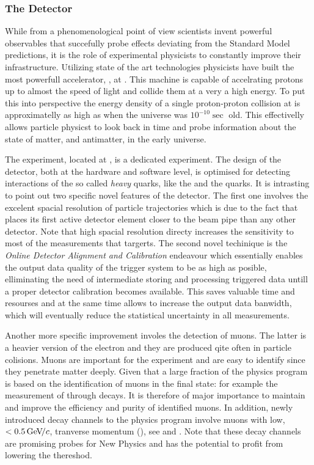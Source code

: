 \subsubsection{The \lhcb Detector}
While from a phenomenological point of view scientists invent powerful observables that succefully probe
effects deviating from the Standard Model predictions, it is the role of experimental physicists to
constantly improve their infrastructure. Utilizing state of the art technologies physicists have
built the most powerfull accelerator, \lhc, at \cern. This machine is capable of accelrating protons
up to almost the speed of light and collide them at a very a high energy. To put this into perspective
the energy density of a single proton-proton collision at \lhc is approximatelly as high as when the
universe was $10^{-10} \sec$ old. This effectivelly allows particle physicst to look back in time and
probe information about the state of matter, and antimatter, in the early universe.

The \lhcb experiment, located at \cern, is a dedicated experiment. The design of the detector,
both at the hardware and software level, is optimised for detecting interactions of the so called
{\it heavy} quarks, like the \bquark and the \cquark quarks. It is intrasting to point out two specific
novel features of the detector. The first one involves the excelent spacial resolution of particle
trajectories which is due to the fact that \lhcb places its first active detector element closer
to the \lhc beam pipe than any other detector. Note that high spacial resolution directy increases
the sensitivity to most of the measurements that \lhcb targerts. The second novel techinique is the
{\it Online Detector Alignment and Calibration} endeavour which essentially enables the output data
quality of the trigger system to be as high as posible, elliminating the need of intermediate storing
and processing triggered data untill a proper detector calibration becomes available.
This saves valuable time and resourses and at the same time allows to increase the output data banwidth,
which will eventually reduce the statistical uncertainty in all \lhcb measurements.

Another more specific improvement involes the detection of muons. The latter is a heavier version of
the electron and they are produced qite often in particle colisions. Muons are important for the \lhcb
experiment and are easy to identify since they penetrate matter deeply. Given that a large fraction of
the \lhcb physics program is based on the identification of muons in the final state: for example the
measurement of \phis through \BsJpsiPhi decays. It is therefore of major importance to maintain and
improve the efficiency and purity of identified muons. In addition, newly introduced decay channels
to the \lhcb physics program involve muons with low, $<0.5 {\mathrm{\,Ge\kern -0.1em V\!/}c}$, tranverse momentum (\pt), see
\cite{LHCB-CONF-2016-013-001} and \cite{LHCb-CONF-2016-012}. Note that these decay channels are
promising probes for New Physics and \lhcb has the potential to profit from lowering the \pt thereshod.

